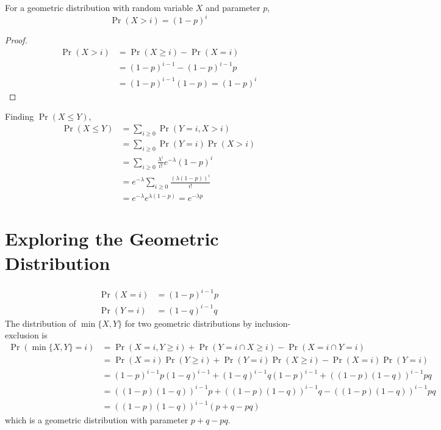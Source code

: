 \documentclass{article}
\begin{document}
\begin{lemma}
    For a geometric distribution with random variable \(X\) and parameter \(p\),
    \begin{equation}
        \Pr(X > i) = (1 - p)^i
    \end{equation}
\end{lemma}
\begin{proof}
    \begin{align}
        \Pr(X > i) &= \Pr(X \geqslant i) - \Pr(X = i) \\
        &= (1 - p)^{i - 1} - (1 - p)^{i - 1} p \\
        &= (1 - p)^{i - 1} (1 - p) = (1 - p)^i
    \end{align}
\end{proof}
Finding \(\Pr(X \leqslant Y)\),
\begin{align}
    \Pr(X \leqslant Y) &= \sum_{i \geqslant 0} \Pr(Y = i, X > i) \\
    &= \sum_{i \geqslant 0} \Pr(Y = i) \Pr(X > i) \\
    &= \sum_{i \geqslant 0} \frac{\lambda^i}{i!} e^{-\lambda} (1 - p)^i \\
    &= e^{-\lambda} \sum_{i \geqslant 0} \frac{(\lambda (1 - p))^i}{i!} \\
    &= e^{-\lambda} e^{\lambda (1 - p)} = e^{-\lambda p}
\end{align}

\section{Exploring the Geometric Distribution}

\begin{align}
    \Pr(X = i) &= (1 - p)^{i - 1} p \\
    \Pr(Y = i) &= (1 - q)^{i - 1} q
\end{align}
The distribution of \(\min\{X, Y\}\) for two geometric distributions by inclusion-exclusion is
\begin{align}
    \Pr(\min\{X, Y\} = i) &= \Pr(X = i, Y \geqslant i) + \Pr(Y = i \cap X \geqslant i) - \Pr(X = i \cap Y = i) \\
    &= \Pr(X = i) \Pr(Y \geqslant i) + \Pr(Y = i) \Pr(X \geqslant i) - \Pr(X = i) \Pr(Y = i) \\
    &= (1 - p)^{i - 1} p (1 - q)^{i - 1} + (1 - q)^{i - 1} q (1 - p)^{i - 1} + ((1 - p) (1 - q))^{i - 1} pq \\
    &= ((1 - p) (1 - q))^{i - 1} p + ((1 - p) (1 - q))^{i - 1} q - ((1 - p) (1 - q))^{i - 1} pq \\
    &= ((1 - p) (1 - q))^{i - 1} (p + q - pq)
\end{align}
which is a geometric distribution with parameter \(p + q - pq\).
\end{document}
